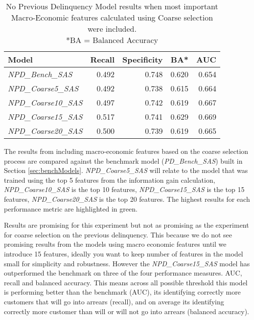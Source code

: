 \begin{table}[H]
	\centering
	\small
	\begin{tabular}{l r r r r}
		\hline
		\textbf{Model} & \textbf{Recall} & \textbf{Specificity} & \textbf{BA*} & \textbf{AUC}  \\ \hline
		\textit{NPD\_Bench\_SAS} & 0.492 & \cellcolor{green!25}0.748 & 0.620 & 0.654 \\ \hline
		\textit{NPD\_Coarse5\_SAS}  & 0.492 & 0.738 & 0.615 & 0.664   \\ 
		\textit{NPD\_Coarse10\_SAS} & 0.497 & 0.742 & 0.619 & 0.667  \\ 
		\textit{NPD\_Coarse15\_SAS} & \cellcolor{green!25}0.517 & 0.741 & \cellcolor{green!25}0.629 & \cellcolor{green!25}0.669  \\
		\textit{NPD\_Coarse20\_SAS} & 0.500 & 0.739 & 0.619 & 0.665  \\\hline 
	\end{tabular}
	\caption{{No Previous Delinquency Model results when most important\\
			Macro-Economic features calculated using Coarse selection were included.
			\\ *BA = Balanced Accuracy}}
	\label{table:CoarseNPDModelResults}
\end{table}
The results from including macro-economic features based on the coarse selection process are compared against the benchmark model (\textit{PD\_Bench\_SAS}) built in Section \ref{sec:benchModels}. \textit{NPD\_Coarse5\_SAS} will relate to the model that was trained using the top 5 features from the information gain calculation, \textit{NPD\_Coarse10\_SAS} is the top 10 features, \textit{NPD\_Coarse15\_SAS} is the top 15 features, \textit{NPD\_Coarse20\_SAS} is the top 20 features. The highest results for each performance metric are highlighted in green.

Results are promising for this experiment but not as promising as the experiment for coarse selection on the previous delinquency. This because we do not see promising results from the models using macro economic features until we introduce 15 features, ideally you want to keep number of features in the model small for simplicity and robustness. However the \textit{NPD\_Coarse15\_SAS} model has outperformed the benchmark on three of the four performance measures. AUC, recall and balanced accuracy. This means across all possible threshold this model is performing better than the benchmark (AUC), its identifying correctly more customers that will go into arrears (recall), and on average its identifying correctly more customer than will or will not go into arrears (balanced accuracy). 

